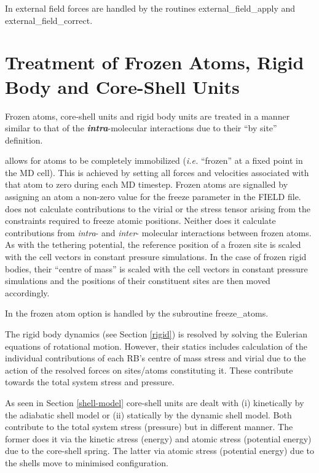 In \D external field forces are
handled by the routines {\sc external\_field\_apply} and
{\sc external\_field\_correct}.

\section{Treatment of Frozen Atoms, Rigid Body and Core-Shell Units}

Frozen atoms, core-shell units and rigid body units are treated in a
manner similar to that of the {\em \bf intra}-molecular interactions due to
their ``by site'' definition.

\D allows for atoms to be completely immobilized ({\em i.e.}
``frozen'' at a fixed point in the MD cell).  This is achieved by
setting all forces and velocities associated with that atom to
zero during each MD timestep.  Frozen atoms are signalled by
assigning an atom a non-zero value for the freeze parameter in the
FIELD file.  \D does not calculate contributions to the virial or
the stress tensor arising from the
constraints required to freeze atomic positions.  Neither does it
calculate contributions from {\em intra}- and {\em inter}- molecular
interactions between frozen atoms.  As with the tethering
potential, the reference position of a frozen site is scaled with
the cell vectors in constant pressure simulations.  In the case of
frozen rigid bodies, their ``centre of mass'' is scaled with
the cell vectors in constant pressure simulations and the positions
of their constituent sites are then moved accordingly.

In \D the frozen atom option is handled by the subroutine {\sc freeze\_atoms}.

The rigid body dynamics (see Section \ref{rigid}) is resolved by
solving the Eulerian equations of rotational motion.
However, their statics includes calculation of the individual
contributions of each RB's centre of mass stress and virial
due to the action of the resolved forces on sites/atoms constituting it.
These contribute towards the total system stress and pressure.

As seen in Section \ref{shell-model} core-shell units
are dealt with (i) kinetically by the adiabatic shell model or (ii)
statically by the dynamic shell model.  Both contribute to the total
system stress (pressure) but in different manner.  The former does
it via the kinetic stress (energy) and atomic stress (potential
energy) due to the core-shell spring.  The latter via atomic stress (potential
energy) due to the shells move to minimised configuration.

